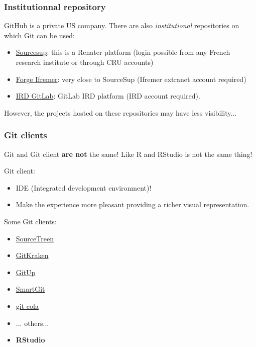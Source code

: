 \documentclass[svgnames]{beamer}
\begin{document}
\begin{frame}
    \frametitle{Institutionnal repository}

    GitHub is a private US company. There are also \emph{institutional} repositories on which Git can be used:

    \begin{itemize}
        \item{\href{https://sourcesup.renater.fr/}{Sourcesup}: this is a Renater platform (login possible from any French research institute or through CRU accounts)}
        \item{\href{https://forge.ifremer.fr/}{Forge Ifremer}: very close to SourceSup (Ifremer extranet account required)}
        \item{\href{gitlab.intranet.ird.fr}{IRD GitLab}: GitLab IRD platform (IRD account required).}
    \end{itemize}

    However, the projects hosted on these repositories may have less visibility...

\end{frame}


\begin{frame}
    \frametitle{Git clients}

    Git and Git client \textbf{are not} the same! Like R and RStudio is not the same thing!
    \hfill \break

    Git client:
    \begin{itemize}
        \item IDE (Integrated development environment)!
        \item Make the experience more pleasant providing a richer visual representation.
    \end{itemize}

    \hfill 

    Some Git clients:
    \begin{itemize}
        \item \href{https://www.sourcetreeapp.com/}{\faStar SourceTreen} 
        \item \href{https://www.gitkraken.com/}{\faStar GitKraken}
        \item \href{https://gitup.co/}{\faStar GitUp} 
        \item \href{https://www.syntevo.com/smartgit/}{\faStar SmartGit} 
        \item \href{https://git-cola.github.io/}{\faStar git-cola} 
        \item ... others... 
        \item \textbf{RStudio} 
    \end{itemize}
\end{frame}
\end{document}
